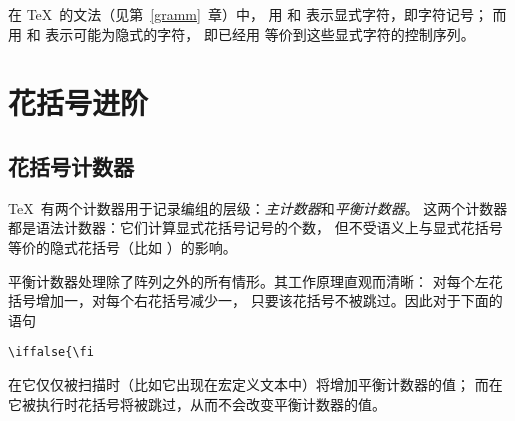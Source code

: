 \documentclass[letterpaper]{book}
\begin{document}
在 \TeX\ 的文法（见第~\ref{gramm}~章）中，
用  和  表示显式字符，即字符记号；
而用 \n{\lb} 和 \n{\rb} 表示可能为隐式的字符，
即已经用  等价到这些显式字符的控制序列。

\section{花括号进阶}

\subsection{花括号计数器}

\TeX\ 有两个计数器用于记录编组的层级：{\it 主计数器}和{\it 平衡计数器}。
这两个计数器都是语法计数器：它们计算显式花括号记号的个数，
但不受语义上与显式花括号等价的隐式花括号（比如 ）的影响。

平衡计数器处理除了阵列之外的所有情形。其工作原理直观而清晰：
对每个左花括号增加一，对每个右花括号减少一，
只要该花括号不被跳过。因此对于下面的语句
\begin{verbatim}
\iffalse{\fi
\end{verbatim}
在它仅仅被扫描时（比如它出现在宏定义文本中）将增加平衡计数器的值；
而在它被执行时花括号将被跳过，从而不会改变平衡计数器的值。
\end{document}
